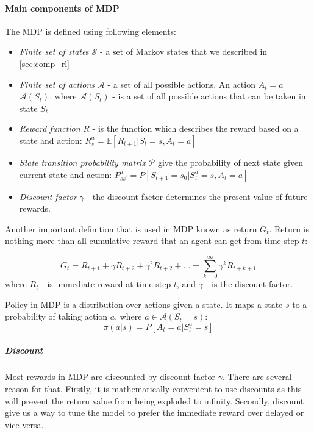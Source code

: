 \paragraph{Main components of MDP} The MDP is defined using following elements:
\begin{itemize}
	\item \emph{Finite set of state}s $\mathcal{S}$ - a set of Markov states that we described in \autoref{sec:comp_rl}
	\item \emph{Finite set of actions} $\mathcal{A}$ - a set of all possible actions.
		An action $A_t = a$ \in $\mathcal{A}(S_t)$, where $\mathcal{A}(S_t)$ -
		is a set of all possible actions that can be taken in state $S_t$
	\item \emph{Reward function} $R$ - is the function which describes
		the reward based on a state and action: $R_s^a = \mathbb{E}[R_{t+1}| S_t = s, A_t = a]$
	\item \emph{State transition probability matrix} $\mathcal{P}$ give
		the probability of next state given current state and action: $P^a_{ss^{\prime}} = P[S_{t+1} = s_0 | S_t^a = s, A_t = a]$
	\item \emph{Discount factor} $\gamma$ - the discount factor determines the present value
	 	of future rewards.
\end{itemize}

Another important definition that is used in MDP known as return $G_t$. Return is nothing
more than all cumulative reward that an agent can get from time step $t$:

\begin{equation} \label{eq:return}
	G_t = R_{t+1} + \gamma R_{t+2} + \gamma^2 R_{t+2} + ... = \sum_{k=0}^{\infty} \gamma^k R_{t+k+1}
\end{equation}
where $R_t$ - is immediate reward at time step $t$,
and $\gamma$ - is the discount factor.

Policy in MDP is a distribution over actions given a state.
It maps a state $s$ to a probability of taking action $a$, where $a \in \mathcal{A}(S_t = s)$:
\begin{equation}
	\pi(a|s) = P[A_t = a|S_t^a = s]
\end{equation}

\subparagraph{Discount} Most rewards in MDP are discounted by discount factor $\gamma$.
There are several reason for that. Firstly, it is mathematically convenient
to use discounts as this will prevent the return value from being exploded to infinity.
Secondly, discount give us a way to tune the model to prefer the immediate reward over
delayed or vice versa.
